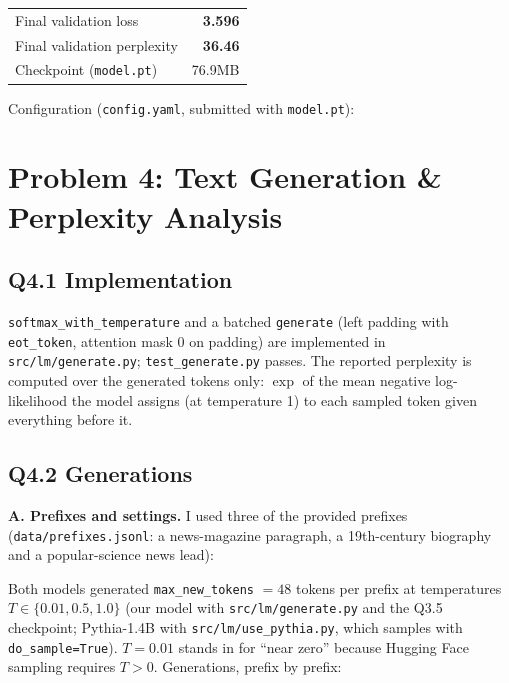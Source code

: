 \documentclass[11pt]{article}
\begin{document}
\begin{center}
\begin{tabular}{lr}
\toprule
Final validation loss & \textbf{3.596} \\
Final validation perplexity & \textbf{36.46} \\
Checkpoint (\texttt{model.pt}) & 76.9MB \\
\bottomrule
\end{tabular}
\end{center}
Configuration (\texttt{config.yaml}, submitted with \texttt{model.pt}):


\section*{Problem 4: Text Generation \& Perplexity Analysis}

\subsection*{Q4.1 Implementation}
\texttt{softmax\_with\_temperature} and a batched \texttt{generate} (left padding with \texttt{eot\_token}, attention mask 0 on padding) are implemented in \texttt{src/lm/generate.py}; \texttt{test\_generate.py} passes. The reported perplexity is computed over the generated tokens only: $\exp$ of the mean negative log-likelihood the model assigns (at temperature 1) to each sampled token given everything before it.

\subsection*{Q4.2 Generations}
\textbf{A. Prefixes and settings.} I used three of the provided prefixes (\texttt{data/prefixes.jsonl}: a news-magazine paragraph, a 19th-century biography and a popular-science news lead):

Both models generated \texttt{max\_new\_tokens} $=48$ tokens per prefix at temperatures $T \in \{0.01, 0.5, 1.0\}$ (our model with \texttt{src/lm/generate.py} and the Q3.5 checkpoint; Pythia-1.4B with \texttt{src/lm/use\_pythia.py}, which samples with \texttt{do\_sample=True}). $T=0.01$ stands in for ``near zero'' because Hugging Face sampling requires $T>0$. Generations, prefix by prefix:
{\small }
\end{document}
